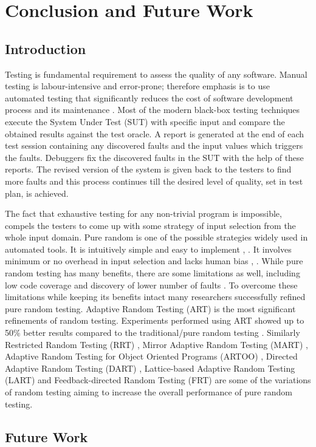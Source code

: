 \chapter{Conclusion and Future Work}
\label{chap:conclusion}

\section{Introduction}\label{sec:intro7}

Testing is fundamental requirement to assess the quality of any software. Manual testing is labour-intensive and error-prone; therefore emphasis is to use automated testing that significantly reduces the cost of software development process and its maintenance \cite{beizer1995black}. Most of the modern black-box testing techniques execute the System Under Test (SUT) with specific input and compare the obtained results against the test oracle. A report is generated at the end of each test session containing any discovered faults and the input values which triggers the faults. Debuggers fix the discovered faults in the SUT with the help of these reports. The revised version of the system is given back to the testers to find more faults and this process continues till the desired level of quality, set in test plan, is achieved.

The fact that exhaustive testing for any non-trivial program is impossible, compels the testers to come up with some strategy of input selection from the whole input domain. Pure random is one of the possible strategies widely used in automated tools. It is intuitively simple and easy to implement \cite{Ciupa2008},  \cite{Forrester2000}. It involves minimum or no overhead in input selection and lacks human bias \cite{hamlet1994},  \cite{Linger1993}. While pure random testing has many benefits, there are some limitations as well, including low code coverage \cite{Offutt1996} and discovery of lower number of faults \cite{Chen1994}. To overcome these limitations while keeping its benefits intact many researchers successfully refined pure random testing. Adaptive Random Testing (ART) is the most significant refinements of random testing. Experiments performed using ART showed up to 50\% better results compared to the traditional/pure random testing  \cite{Chen2008}.  Similarly Restricted Random Testing (RRT) \cite{Chan2002}, Mirror Adaptive Random Testing (MART)  \cite{Chen2004}, Adaptive Random Testing for Object Oriented Programs (ARTOO) \cite{Ciupa2008}, Directed Adaptive Random Testing (DART)  \cite{Godefroid2005}, Lattice-based Adaptive Random Testing (LART) \cite{Mayer2005} and Feedback-directed Random Testing (FRT) \cite{Pacheco2007} are some of the variations of random testing aiming to increase the overall performance of pure random testing.

\section{Future Work}
